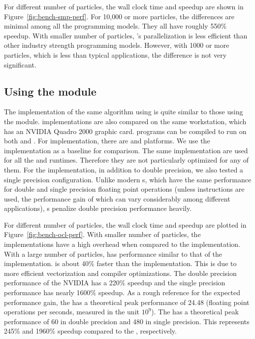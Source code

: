 For different number of particles, the wall clock time and speedup are shown in Figure~\ref{fig:bench-smp-perf}. For 10,000 or more particles, the differences are minimal among all the programming models. They all have roughly 550\% speedup. With smaller number of particles, \vsmc's \cppoo parallelization is less efficient than other industry strength programming models. However, with 1000 or more particles, which is less than typical applications, the difference is not very significant.

\begingroup
\afterpage{\clearpage}
\endgroup

\subsection{Using the \protect\opencl module}
\label{sub:Using the OpenCL module}

The implementation of the same algorithm using \opencl is quite similar to those using the \smp module. \opencl implementations are also compared on the same workstation, which has an NVIDIA Quadro 2000 graphic card. \opencl programs can be compiled to run on both \cpu and \gpu. For \cpu implementation, there are \iocl \cite{iocl} and \aocl \cite{aocl} platforms. We use the \tbb implementation as a baseline for comparison. The same \opencl implementation are used for all the \cpu and \gpu runtimes. Therefore they are not particularly optimized for any of them. For the \gpu implementation, in addition to double precision, we also tested a single precision configuration. Unlike modern \cpu{}s, which have the same performance for double and single precision floating point operations (unless \simd instructions are used, the performance gain of which can vary considerably among different applications), \gpu{}s penalize double precision performance heavily.

For different number of particles, the wall clock time and speedup are plotted in Figure~\ref{fig:bench-ocl-perf}. With smaller number of particles, the \opencl implementations have a high overhead when compared to the \tbb implementation. With a large number of particles, \aocl has performance similar to that of the \tbb implementation. \iocl is about 40\% faster than the \tbb implementation. This is due to more efficient vectorization and compiler optimizations. The double precision performance of the NVIDIA \gpu has a 220\% speedup and the single precision performance has nearly 1600\% speedup. As a rough reference for the expected performance gain, the \cpu has a theoretical peak performance of 24.48 \gflops (floating point operations per seconds, measured in the unit $10^9$). The \gpu has a theoretical peak performance of 60 \gflops in double precision and 480 \gflops in single precision. This represents 245\% and 1960\% speedup compared to the \cpu, respectively.

